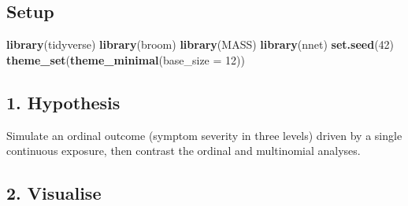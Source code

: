 \documentclass[
]{article}
\newenvironment{Shaded}{\begin{snugshade}}{\end{snugshade}}
\newcommand{\AttributeTok}[1]{\textcolor[rgb]{0.13,0.29,0.53}{#1}}
\newcommand{\DecValTok}[1]{\textcolor[rgb]{0.00,0.00,0.81}{#1}}
\newcommand{\FunctionTok}[1]{\textcolor[rgb]{0.13,0.29,0.53}{\textbf{#1}}}
\newcommand{\NormalTok}[1]{#1}
\begin{document}
\subsection{Setup}\label{setup}

\begin{Shaded}
\begin{Highlighting}[]
\FunctionTok{library}\NormalTok{(tidyverse)}
\FunctionTok{library}\NormalTok{(broom)}
\FunctionTok{library}\NormalTok{(MASS)}
\FunctionTok{library}\NormalTok{(nnet)}
\FunctionTok{set.seed}\NormalTok{(}\DecValTok{42}\NormalTok{)}
\FunctionTok{theme\_set}\NormalTok{(}\FunctionTok{theme\_minimal}\NormalTok{(}\AttributeTok{base\_size =} \DecValTok{12}\NormalTok{))}
\end{Highlighting}
\end{Shaded}

\subsection{1. Hypothesis}\label{hypothesis}

Simulate an ordinal outcome (symptom severity in three levels) driven by
a single continuous exposure, then contrast the ordinal and multinomial
analyses.

\subsection{2. Visualise}\label{visualise}
\end{document}
